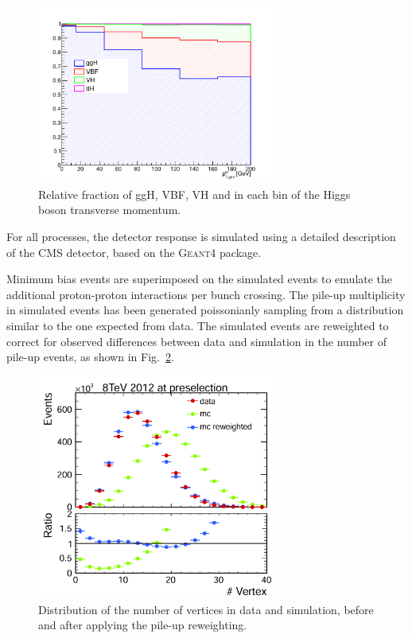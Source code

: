 \begin{figure}[htb]
\centering
\includegraphics[width=0.7\textwidth]{images/signal_composition_ttH.pdf}
\caption{Relative fraction of ggH, VBF, VH and \ttH in each bin of the Higgs boson transverse momentum.}\label{fig:signal_comp}
\end{figure}

For all processes, the detector response is simulated using a detailed description of the CMS detector, based on the \textsc{Geant4} package.

Minimum bias events are superimposed on the simulated events to emulate the additional 
proton-proton interactions per bunch crossing. The pile-up multiplicity in simulated events has been generated poissonianly sampling from a distribution similar to the one expected from data.
The simulated events are reweighted to correct for observed differences between data and simulation in the number of pile-up events, as shown in Fig.~\ref{fig:nvertices}.

\begin{figure}[htb]
\centering
\includegraphics[width=0.7\textwidth]{images/nvertex.pdf}
\caption{Distribution of the number of vertices in data and simulation, before and after applying the pile-up reweighting.}\label{fig:nvertices}
\end{figure}

